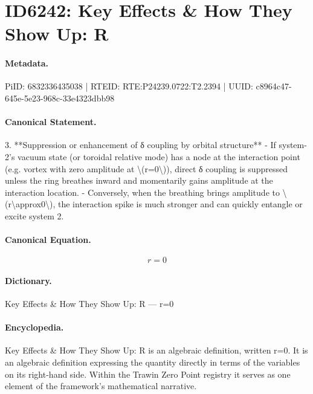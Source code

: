 \section*{ID6242: Key Effects \& How They Show Up: R}
\paragraph{Metadata.}
PiID: 6832336435038 | RTEID: RTE:P24239.0722:T2.2394 | UUID: c8964c47-645e-5e23-968c-33e4323dbb98

\paragraph{Canonical Statement.}
3. **Suppression or enhancement of δ coupling by orbital structure** - If system-2’s vacuum state (or toroidal relative mode) has a node at the interaction point (e.g. vortex with zero amplitude at \textbackslash{}(r=0\textbackslash{})), direct δ coupling is suppressed unless the ring breathes inward and momentarily gains amplitude at the interaction location. - Conversely, when the breathing brings amplitude to \textbackslash{}(r\textbackslash{}approx0\textbackslash{}), the interaction spike is much stronger and can quickly entangle or excite system 2.

\paragraph{Canonical Equation.}
\[
r=0
\]

\paragraph{Dictionary.}
Key Effects \& How They Show Up: R — r=0

\paragraph{Encyclopedia.}
Key Effects \& How They Show Up: R is an algebraic definition, written r=0. It is an algebraic definition expressing the quantity directly in terms of the variables on its right-hand side. Within the Trawin Zero Point registry it serves as one element of the framework's mathematical narrative.
